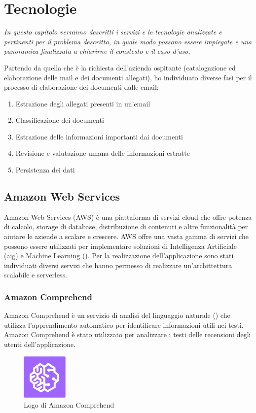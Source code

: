 \chapter{Tecnologie}
\label{cap:tecnologie}
\emph{In questo capitolo verranno descritti i servizi e le tecnologie analizzate e pertinenti per il problema descritto, in quale modo possono essere impiegate e una panoramica finalizzata a chiarirne il constesto e il caso d'uso.}

Partendo da quella che è la richiesta dell'azienda ospitante (catalogazione ed elaborazione delle mail e dei documenti allegati), ho individuato diverse fasi per il processo di elaborazione dei documenti dalle email: 
\begin{enumerate}
  \item Estrazione degli allegati presenti in un'email
  \item Classificazione dei documenti
  \item Estrazione delle informazioni importanti dai documenti
  \item  Revisione e valutazione umana delle informazioni estratte
  \item Persistenza dei dati
\end{enumerate}
\section{Amazon Web Services}
Amazon Web Services (AWS) è una piattaforma di servizi cloud che offre potenza di calcolo, storage di database, distribuzione di contenuti e altre funzionalità per aiutare le aziende a scalare e crescere. AWS offre una vasta gamma di servizi che possono essere utilizzati per implementare soluzioni di Intelligenza Artificiale ({\gls{aig}}) e Machine Learning (). Per la realizzazione dell'applicazione sono stati individuati diversi servizi che hanno permesso di realizzare un'archittettura scalabile e serverless. 

\subsection{Amazon Comprehend}
Amazon Comprehend è un servizio di analisi del linguaggio naturale () che utilizza l'apprendimento automatico per identificare informazioni utili nei testi. Amazon Comprehend è stato utilizzato per analizzare i testi delle recensioni degli utenti dell'applicazione.

\begin{figure}[h]
  \centering
  \includegraphics[width=0.2\textwidth]{img/tecnologie/comprehend.png}
  \caption{Logo di Amazon Comprehend}
  \label{fig:comprehend}
\end{figure}

